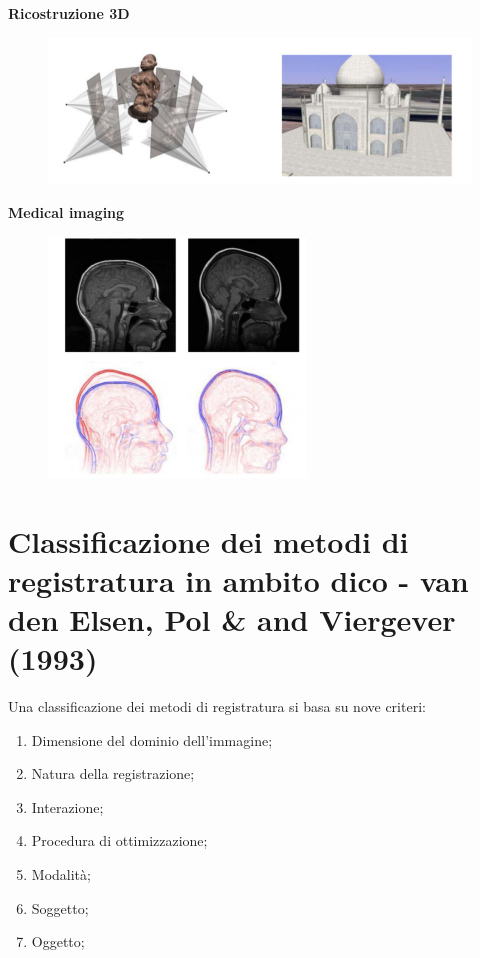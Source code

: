 \textbf{Ricostruzione 3D}
\begin{figure}[H]
    \centering
    \includegraphics[width=\linewidth, keepaspectratio]{capitoli/immagini/imgs/ricostruzione-3-d.png}
\end{figure}

\textbf{Medical imaging}
\begin{figure}[H]
    \centering
    \includegraphics[width=\linewidth, keepaspectratio]{capitoli/immagini/imgs/medical-imaging.png}
\end{figure}

\section{Classificazione dei metodi di registratura in ambito dico - van den Elsen, Pol \& and Viergever (1993)}
Una classificazione dei metodi di registratura si basa su nove
criteri:
\begin{enumerate}
    \item Dimensione del dominio dell'immagine;
    \item Natura della registrazione;
    \item Interazione;
    \item Procedura di ottimizzazione;
    \item Modalità;
    \item Soggetto;
    \item Oggetto;
\end{enumerate}

